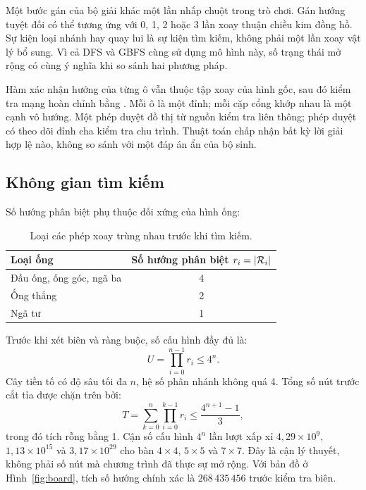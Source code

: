 Một bước gán của bộ giải khác một lần nhấp chuột trong trò chơi. Gán hướng
tuyệt đối có thể tương ứng với 0, 1, 2 hoặc 3 lần xoay thuận chiều kim đồng hồ.
Sự kiện loại nhánh hay quay lui là sự kiện tìm kiếm, không phải một lần xoay
vật lý bổ sung. Vì cả DFS và GBFS cùng sử dụng mô hình này, số trạng thái mở
rộng có cùng ý nghĩa khi so sánh hai phương pháp.

Hàm  xác nhận hướng của từng ô vẫn thuộc tập xoay
của hình gốc, sau đó kiểm tra mạng hoàn chỉnh bằng .
Mỗi ô là một đỉnh; mỗi cặp cổng khớp nhau là một cạnh vô hướng. Một phép duyệt
đồ thị từ nguồn kiểm tra liên thông; phép duyệt có theo dõi đỉnh cha kiểm tra
chu trình. Thuật toán chấp nhận bất kỳ lời giải hợp lệ nào, không so sánh với
một đáp án ẩn của bộ sinh.

\subsection{Không gian tìm kiếm}

Số hướng phân biệt phụ thuộc đối xứng của hình ống:
\begin{table}[H]\centering
\begin{tabular}{@{}lc@{}}\toprule
Loại ống & Số hướng phân biệt $r_i=|\mathcal{R}_i|$\\\midrule
Đầu ống, ống góc, ngã ba & 4\\
Ống thẳng & 2\\
Ngã tư & 1\\\bottomrule
\end{tabular}
\caption{Loại các phép xoay trùng nhau trước khi tìm kiếm.}
\end{table}

Trước khi xét biên và ràng buộc, số cấu hình đầy đủ là:
\begin{equation}
U=\prod_{i=0}^{n-1}r_i\leq4^n.
\end{equation}
Cây tiền tố có độ sâu tối đa $n$, hệ số phân nhánh không quá 4. Tổng số nút
trước cắt tỉa được chặn trên bởi:
\begin{equation}
T=\sum_{k=0}^{n}\prod_{i=0}^{k-1}r_i
\leq \frac{4^{n+1}-1}{3},
\end{equation}
trong đó tích rỗng bằng 1. Cận số cấu hình $4^n$ lần lượt xấp xỉ
$4{,}29\times10^9$, $1{,}13\times10^{15}$ và $3{,}17\times10^{29}$ cho
bàn $4\times4$, $5\times5$ và $7\times7$. Đây là cận lý thuyết, không phải
số nút mà chương trình đã thực sự mở rộng. Với bản đồ ở Hình~\ref{fig:board},
tích số hướng chính xác là $268\,435\,456$ trước kiểm tra biên.

